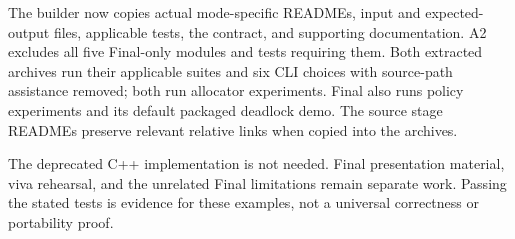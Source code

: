 \documentclass[11pt,a4paper]{article}
\begin{document}
The builder now copies actual mode-specific READMEs, input and expected-output
files, applicable tests, the contract, and supporting documentation. A2 excludes
all five Final-only modules and tests requiring them. Both extracted archives
run their applicable suites and six CLI choices with source-path assistance
removed; both run allocator experiments. Final also runs policy experiments
and its default packaged deadlock demo. The source stage READMEs preserve
relevant relative links when copied into the archives.

The deprecated C++ implementation is not needed. Final presentation material,
viva rehearsal, and the unrelated Final limitations remain separate work.
Passing the stated tests is evidence for these examples, not a universal
correctness or portability proof.
\end{document}
